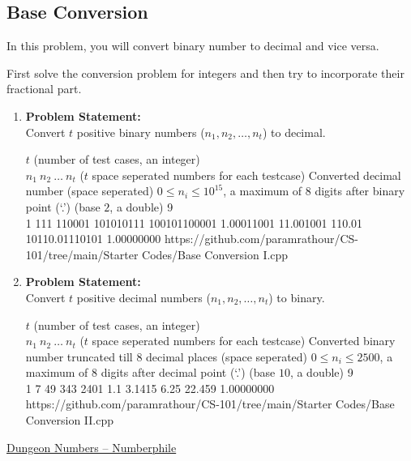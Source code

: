 \documentclass[../../Problems]{subfiles}
\begin{document}
\subsection{Base Conversion}{\label{pp:baseconversion}}
In this problem, you will convert binary number to decimal and vice versa.
\begin{hint}
First solve the conversion problem for integers and then try to incorporate their fractional part.
\end{hint}
\begin{enumerate}[label=(\alph*)]
\item 
\textbf{Problem Statement:}\\
Convert $t$ positive binary numbers ($n_1,n_2,\ldots,n_t$) to decimal.
\begin{testcases}
	{$t$ \hfill(number of test cases, an integer)\\
	$n_1\ n_2\ \ldots\ n_t$ \hfill($t$ space seperated numbers for each testcase)}
	{Converted decimal number \hfill(space seperated)}
	{$0\leq n_i\leq 10^{15}$, a maximum of $8$ digits after binary point (`.') \hfill(base $2$, a double)}
	{9\\1 111 110001 101010111 100101100001 1.00011001 11.001001 110.01 10110.01110101}
	{1.00000000}
	{https://github.com/paramrathour/CS-101/tree/main/Starter Codes/Base Conversion I.cpp}
\end{testcases}
\item 
\textbf{Problem Statement:}\\
Convert $t$ positive decimal numbers ($n_1,n_2,\ldots,n_t$) to binary.
\begin{testcases}
	{$t$ \hfill(number of test cases, an integer)\\
	$n_1\ n_2\ \ldots\ n_t$ \hfill($t$ space seperated numbers for each testcase)}
	{Converted binary number truncated till $8$ decimal places \hfill(space seperated)}
	{$0\leq n_i\leq 2500$, a maximum of $8$ digits after decimal point (`.') \hfill(base $10$, a double)}
	{9\\1 7 49 343 2401 1.1 3.1415 6.25 22.459}
	{1.00000000}
	{https://github.com/paramrathour/CS-101/tree/main/Starter Codes/Base Conversion II.cpp}
\end{testcases}
\end{enumerate}
\begin{funvideo}
\href{https://youtu.be/xNx3JxRhnZE}{Dungeon Numbers -- Numberphile}
\end{funvideo}
\end{document}
